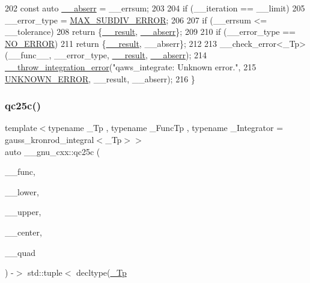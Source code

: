 \begin{DoxyCode}
202       \textcolor{keyword}{const} \textcolor{keyword}{auto} \hyperlink{namespace____gnu__cxx_a72f736cff127f1574e91a301de9e074b}{\_\_abserr} = \_\_errsum;
203 
204       \textcolor{keywordflow}{if} (\_\_iteration == \_\_limit)
205         \_\_error\_type = \hyperlink{namespace____gnu__cxx_ad6c62dd86a596716cece6ac2d4cfd4b3a4c1e6a4f8a49af2eae50e4bf6f93e016}{MAX\_SUBDIV\_ERROR};
206 
207       \textcolor{keywordflow}{if} (\_\_errsum <= \_\_tolerance)
208         \textcolor{keywordflow}{return} \{\hyperlink{namespace____gnu__cxx_a500ea9f53aeaecd8c2ae657503450578}{\_\_result}, \hyperlink{namespace____gnu__cxx_a72f736cff127f1574e91a301de9e074b}{\_\_abserr}\};
209 
210       \textcolor{keywordflow}{if} (\_\_error\_type == \hyperlink{namespace____gnu__cxx_ad6c62dd86a596716cece6ac2d4cfd4b3ac31eecc280b10dec2efb4a2216ccc2e0}{NO\_ERROR})
211         \textcolor{keywordflow}{return} \{\hyperlink{namespace____gnu__cxx_a500ea9f53aeaecd8c2ae657503450578}{\_\_result}, \_\_abserr\};
212 
213       \_\_check\_error<\_Tp>(\_\_func\_\_, \_\_error\_type, \hyperlink{namespace____gnu__cxx_a500ea9f53aeaecd8c2ae657503450578}{\_\_result}, \hyperlink{namespace____gnu__cxx_a72f736cff127f1574e91a301de9e074b}{\_\_abserr});
214       \hyperlink{namespace____gnu__cxx_a2ae22137ca092b8ae10f4d42b4e32cfb}{\_\_throw\_integration\_error}(\textcolor{stringliteral}{"qaws\_integrate: Unknown error."},
215                                 \hyperlink{namespace____gnu__cxx_ad6c62dd86a596716cece6ac2d4cfd4b3a7c57c614db2692fad0a19cb2ded33ed3}{UNKNOWN\_ERROR}, \_\_result, \_\_abserr);
216     \}
\end{DoxyCode}
\mbox{\label{namespace____gnu__cxx_a0eeb3014f3114b5d73059433b58fba86}} 
\subsubsection{\texorpdfstring{qc25c()}{qc25c()}}
{\footnotesize\ttfamily template$<$typename \+\_\+\+Tp , typename \+\_\+\+Func\+Tp , typename \+\_\+\+Integrator  = gauss\+\_\+kronrod\+\_\+integral$<$\+\_\+\+Tp$>$$>$ \\
auto \+\_\+\+\_\+gnu\+\_\+cxx\+::qc25c (\begin{DoxyParamCaption}\item[{\+\_\+\+Func\+Tp}]{\+\_\+\+\_\+func,  }\item[{\hyperlink{namespace____gnu__cxx_a3b19a9c800ca194374ef9172290f7d79}{\+\_\+\+Tp}}]{\+\_\+\+\_\+lower,  }\item[{\hyperlink{namespace____gnu__cxx_a3b19a9c800ca194374ef9172290f7d79}{\+\_\+\+Tp}}]{\+\_\+\+\_\+upper,  }\item[{\hyperlink{namespace____gnu__cxx_a3b19a9c800ca194374ef9172290f7d79}{\+\_\+\+Tp}}]{\+\_\+\+\_\+center,  }\item[{\+\_\+\+Integrator}]{\+\_\+\+\_\+quad }\end{DoxyParamCaption}) -\/$>$  std\+::tuple$<$ decltype(\hyperlink{namespace____gnu__cxx_a3b19a9c800ca194374ef9172290f7d79}{\+\_\+\+Tp}}

